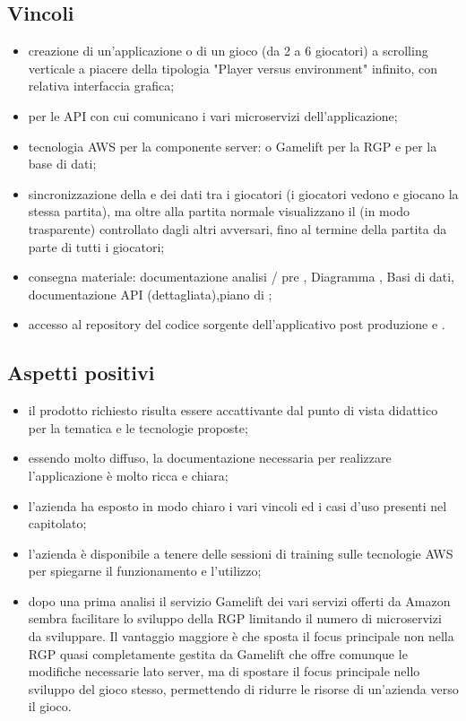 \subsection{Vincoli}
\begin{itemize}
\item creazione di un'applicazione  o  di un gioco (da 2 a 6 giocatori) a scrolling verticale a piacere della tipologia "Player versus environment" infinito, con relativa interfaccia grafica;
\item {} per le API con cui comunicano i vari microservizi dell'applicazione;
\item tecnologia AWS per la componente server:  o Gamelift per la RGP e  per la base di dati;    
\item sincronizzazione della  e dei dati tra i giocatori (i giocatori vedono e giocano la stessa partita), ma oltre alla partita normale visualizzano il  (in modo trasparente) controllato dagli altri avversari, fino al termine della partita da parte di tutti i giocatori;
\item consegna materiale: documentazione analisi / pre , Diagramma  ,  Basi di dati, documentazione API (dettagliata),piano di ;
\item accesso al repository del codice sorgente dell'applicativo post produzione e  .
\end{itemize}

\subsection{Aspetti positivi}
\begin{itemize}
\item il prodotto richiesto risulta essere accattivante dal punto di vista didattico per la tematica e le tecnologie proposte;
\item essendo  molto diffuso, la documentazione necessaria per realizzare l'applicazione è molto ricca e chiara;
\item l'azienda ha esposto in modo chiaro i vari vincoli ed i casi d'uso presenti nel capitolato;
\item l'azienda \`e disponibile a tenere delle sessioni di training sulle tecnologie AWS per spiegarne il funzionamento e l'utilizzo;
\item dopo una prima analisi il servizio Gamelift dei vari servizi offerti da Amazon sembra facilitare lo sviluppo della RGP limitando il numero di microservizi da sviluppare. Il vantaggio maggiore è che sposta il focus principale non nella RGP quasi completamente gestita da Gamelift che offre comunque le modifiche necessarie lato server, ma di spostare il focus principale nello sviluppo del gioco stesso, permettendo di ridurre le risorse  di un’azienda verso il gioco.
\end{itemize}
